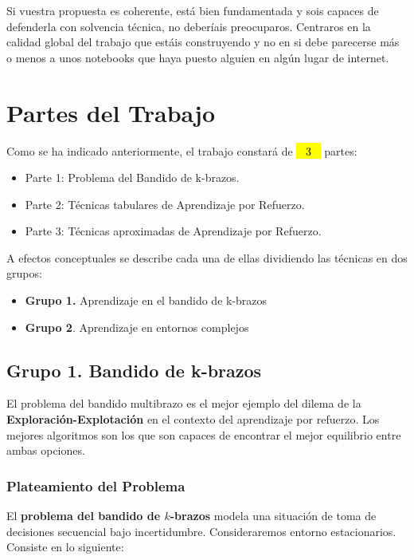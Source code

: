 \documentclass[a4paper, 11pt]{article}
\begin{document}
Si vuestra propuesta es coherente, está bien fundamentada y sois capaces de defenderla con solvencia técnica, no deberíais preocuparos. Centraros en la calidad global del trabajo que estáis construyendo y no en si debe parecerse más o menos a unos notebooks que haya puesto alguien en algún lugar de internet.








\section{Partes del Trabajo}


Como se ha indicado anteriormente, el trabajo constará de \hl{~ 3 ~} partes:
\begin{itemize}
\item Parte 1: Problema del Bandido de k-brazos.
\item Parte 2: Técnicas tabulares de Aprendizaje por Refuerzo.
\item Parte 3: Técnicas aproximadas de Aprendizaje por Refuerzo.
\end{itemize}


 A efectos conceptuales se describe cada una de ellas dividiendo las técnicas en dos grupos:
 \begin{itemize}
 \item \textbf{Grupo 1.} Aprendizaje en el bandido de k-brazos
 \item \textbf{Grupo 2}. Aprendizaje en entornos complejos
 \end{itemize}
 



\subsection{Grupo 1. Bandido de k-brazos}

El problema del bandido multibrazo es el mejor ejemplo del dilema de la \textbf{Exploración-Explotación} en el contexto del aprendizaje por refuerzo. Los mejores algoritmos son los que son capaces de encontrar el mejor equilibrio entre ambas opciones. 

\subsubsection{Plateamiento del Problema}

El \textbf{problema del bandido de \( k \)-brazos} modela una situación de toma de decisiones secuencial bajo incertidumbre. Consideraremos entorno estacionarios. Consiste en lo siguiente:
\end{document}
